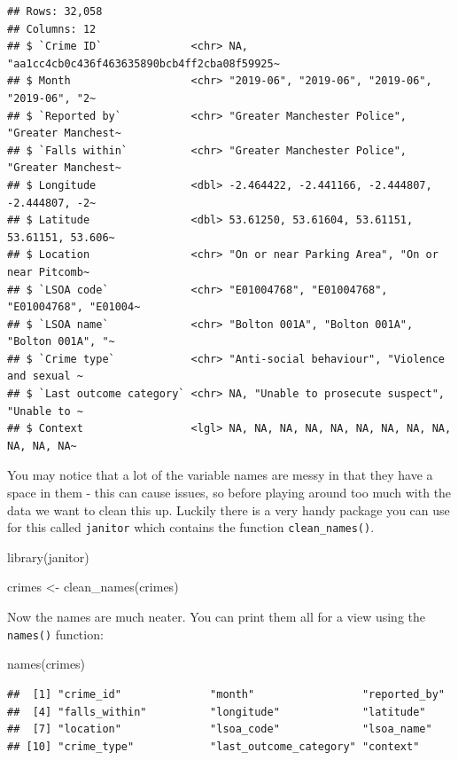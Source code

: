 \documentclass[
]{book}
\newenvironment{Shaded}{\begin{snugshade}}{\end{snugshade}}
\newcommand{\FunctionTok}[1]{\textcolor[rgb]{0.00,0.00,0.00}{#1}}
\newcommand{\NormalTok}[1]{#1}
\newcommand{\OtherTok}[1]{\textcolor[rgb]{0.56,0.35,0.01}{#1}}
\begin{document}
\begin{verbatim}
## Rows: 32,058
## Columns: 12
## $ `Crime ID`              <chr> NA, "aa1cc4cb0c436f463635890bcb4ff2cba08f59925~
## $ Month                   <chr> "2019-06", "2019-06", "2019-06", "2019-06", "2~
## $ `Reported by`           <chr> "Greater Manchester Police", "Greater Manchest~
## $ `Falls within`          <chr> "Greater Manchester Police", "Greater Manchest~
## $ Longitude               <dbl> -2.464422, -2.441166, -2.444807, -2.444807, -2~
## $ Latitude                <dbl> 53.61250, 53.61604, 53.61151, 53.61151, 53.606~
## $ Location                <chr> "On or near Parking Area", "On or near Pitcomb~
## $ `LSOA code`             <chr> "E01004768", "E01004768", "E01004768", "E01004~
## $ `LSOA name`             <chr> "Bolton 001A", "Bolton 001A", "Bolton 001A", "~
## $ `Crime type`            <chr> "Anti-social behaviour", "Violence and sexual ~
## $ `Last outcome category` <chr> NA, "Unable to prosecute suspect", "Unable to ~
## $ Context                 <lgl> NA, NA, NA, NA, NA, NA, NA, NA, NA, NA, NA, NA~
\end{verbatim}

You may notice that a lot of the variable names are messy in that they have a space in them - this can cause issues, so before playing around too much with the data we want to clean this up. Luckily there is a very handy package you can use for this called \texttt{janitor} which contains the function \texttt{clean\_names()}.

\begin{Shaded}
\begin{Highlighting}[]
\FunctionTok{library}\NormalTok{(janitor)}

\NormalTok{crimes }\OtherTok{\textless{}{-}} \FunctionTok{clean\_names}\NormalTok{(crimes)}
\end{Highlighting}
\end{Shaded}

Now the names are much neater. You can print them all for a view using the \texttt{names()} function:

\begin{Shaded}
\begin{Highlighting}[]
\FunctionTok{names}\NormalTok{(crimes)}
\end{Highlighting}
\end{Shaded}

\begin{verbatim}
##  [1] "crime_id"              "month"                 "reported_by"          
##  [4] "falls_within"          "longitude"             "latitude"             
##  [7] "location"              "lsoa_code"             "lsoa_name"            
## [10] "crime_type"            "last_outcome_category" "context"
\end{verbatim}
\end{document}
